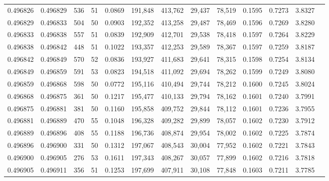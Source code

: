 \begin{tabular}{rrrrrrrrrrrrr}
0.496826 & 0.496829 & 536 &  51 &                                     0.0869 & 191,848 & 413,762 &  29,437 &  78,519 & 0.1595 & 0.7273 & 3.8327 \\
0.496829 & 0.496833 & 504 &  50 &                                     0.0903 & 192,352 & 413,258 &  29,487 &  78,469 & 0.1596 & 0.7269 & 3.8280 \\
0.496833 & 0.496838 & 557 &  51 &                                     0.0839 & 192,909 & 412,701 &  29,538 &  78,418 & 0.1597 & 0.7264 & 3.8229 \\
0.496838 & 0.496842 & 448 &  51 &                                     0.1022 & 193,357 & 412,253 &  29,589 &  78,367 & 0.1597 & 0.7259 & 3.8187 \\
0.496842 & 0.496849 & 570 &  52 &                                     0.0836 & 193,927 & 411,683 &  29,641 &  78,315 & 0.1598 & 0.7254 & 3.8134 \\
0.496849 & 0.496859 & 591 &  53 &                                     0.0823 & 194,518 & 411,092 &  29,694 &  78,262 & 0.1599 & 0.7249 & 3.8080 \\
0.496859 & 0.496868 & 598 &  50 &                                     0.0772 & 195,116 & 410,494 &  29,744 &  78,212 & 0.1600 & 0.7245 & 3.8024 \\
0.496868 & 0.496875 & 361 &  50 &                                     0.1217 & 195,477 & 410,133 &  29,794 &  78,162 & 0.1601 & 0.7240 & 3.7991 \\
0.496875 & 0.496881 & 381 &  50 &                                     0.1160 & 195,858 & 409,752 &  29,844 &  78,112 & 0.1601 & 0.7236 & 3.7955 \\
0.496881 & 0.496889 & 470 &  55 &                                     0.1048 & 196,328 & 409,282 &  29,899 &  78,057 & 0.1602 & 0.7230 & 3.7912 \\
0.496889 & 0.496896 & 408 &  55 &                                     0.1188 & 196,736 & 408,874 &  29,954 &  78,002 & 0.1602 & 0.7225 & 3.7874 \\
0.496896 & 0.496900 & 331 &  50 &                                     0.1312 & 197,067 & 408,543 &  30,004 &  77,952 & 0.1602 & 0.7221 & 3.7843 \\
0.496900 & 0.496905 & 276 &  53 &                                     0.1611 & 197,343 & 408,267 &  30,057 &  77,899 & 0.1602 & 0.7216 & 3.7818 \\
0.496905 & 0.496911 & 356 &  51 &                                     0.1253 & 197,699 & 407,911 &  30,108 &  77,848 & 0.1603 & 0.7211 & 3.7785 \\

\end{tabular}
